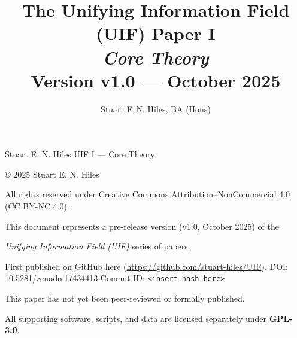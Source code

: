 
            {Stuart E. N. Hiles}
            {UIF I — Core Theory}


\title{The Unifying Information Field (UIF) Paper I\\[0.35em]
\Large\textit{Core Theory}\\[0.6em]   %
\small Version v1.0 — October 2025}
\author{Stuart E.\,N. Hiles, BA (Hons)}
\date{}


\begin{center}
\thispagestyle{empty}
\vspace{2em}
{\small
© 2025 Stuart E. N. Hiles 

All rights reserved under Creative Commons Attribution–NonCommercial 4.0 (CC BY-NC 4.0).  
\newline

This document represents a pre-release version (v1.0, October 2025) of the 

\textit{Unifying Information Field (UIF)} series of papers.

First published on GitHub here (\url{https://github.com/stuart-hiles/UIF}).
\newline DOI: \href{https://doi.org/10.5281/zenodo.17434413}{10.5281/zenodo.17434413}  
Commit ID: \texttt{<insert-hash-here>}
}
\newline

This paper has not yet been peer-reviewed or formally published.  
\newline

All supporting software, scripts, and data are licensed separately under \textbf{GPL-3.0}.
\end{center}

\maketitle

